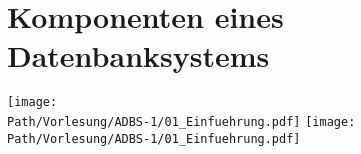 \chapter{Komponenten eines Datenbanksystems}
	\begin{center}
		\texttt{[image: \\Path/Vorlesung/ADBS-1/01\_Einfuehrung.pdf]}
		\texttt{[image: \\Path/Vorlesung/ADBS-1/01\_Einfuehrung.pdf]}
	\end{center}
